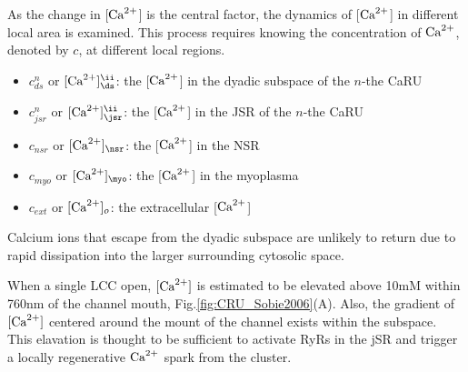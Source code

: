 As the change in [${\text{Ca}^{2+}}$] is the central factor, the dynamics of
[${\text{Ca}^{2+}}$] in different local area is examined. This process
requires knowing the concentration of ${\text{Ca}^{2+}}$, denoted by $c$, at
different local regions.

\begin{itemize}
\item $c^n_{ds}$ or $[\Ca]_\ds^\ii$: the [${\text{Ca}^{2+}}$] in the dyadic subspace of the
  $n$-the CaRU

\item $c^n_{jsr}$ or $[\Ca]_\jsr^\ii$: the [${\text{Ca}^{2+}}$] in the JSR of
  the $n$-the CaRU

\item $c_{nsr}$ or $[\Ca]_\nsr$: the [${\text{Ca}^{2+}}$] in the NSR

\item $c_{myo}$ or $[\Ca]_\myo$: the [${\text{Ca}^{2+}}$] in the myoplasma

\item $c_{ext}$ or $[{\text{Ca}^{2+}}]_o$: the extracellular [${\text{Ca}^{2+}}$]
\end{itemize}
Calcium ions that escape from the dyadic subspace are unlikely to return due to
rapid dissipation into the larger surrounding cytosolic space.

When a single LCC open, $[{\text{Ca}^{2+}}]$ is estimated to be elevated above 10mM within
760nm of the channel mouth, Fig.\ref{fig:CRU_Sobie2006}(A). Also, the gradient
of $[{\text{Ca}^{2+}}]$ centered around the mount of the channel exists within the subspace.
This elavation is thought to be sufficient to activate RyRs in the jSR and
trigger a locally regenerative ${\text{Ca}^{2+}}$ spark from the cluster.

